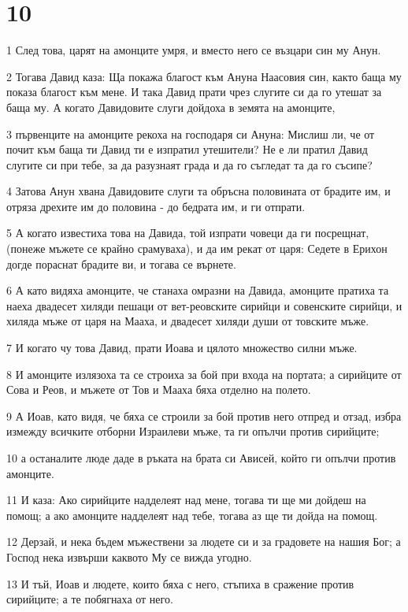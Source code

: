 \chapter{10}

\par 1 След това, царят на амонците умря, и вместо него се възцари син му Анун.
\par 2 Тогава Давид каза: Ща покажа благост към Ануна Наасовия син, както баща му показа благост към мене. И така Давид прати чрез слугите си да го утешат за баща му. А когато Давидовите слуги дойдоха в земята на амонците,
\par 3 първенците на амонците рекоха на господаря си Ануна: Мислиш ли, че от почит към баща ти Давид ти е изпратил утешители? Не е ли пратил Давид слугите си при тебе, за да разузнаят града и да го съгледат та да го съсипе?
\par 4 Затова Анун хвана Давидовите слуги та обръсна половината от брадите им, и отряза дрехите им до половина - до бедрата им, и ги отпрати.
\par 5 А когато известиха това на Давида, той изпрати човеци да ги посрещнат, (понеже мъжете се крайно срамуваха), и да им рекат от царя: Седете в Ерихон догде пораснат брадите ви, и тогава се върнете.
\par 6 А като видяха амонците, че станаха омразни на Давида, амонците пратиха та наеха двадесет хиляди пешаци от вет-реовските сирийци и совенските сирийци, и хиляда мъже от царя на Мааха, и двадесет хиляди души от товските мъже.
\par 7 И когато чу това Давид, прати Иоава и цялото множество силни мъже.
\par 8 И амонците излязоха та се строиха за бой при входа на портата; а сирийците от Сова и Реов, и мъжете от Тов и Мааха бяха отделно на полето.
\par 9 А Иоав, като видя, че бяха се строили за бой против него отпред и отзад, избра измежду всичките отборни Израилеви мъже, та ги опълчи против сирийците;
\par 10 а останалите люде даде в ръката на брата си Ависей, който ги опълчи против амонците.
\par 11 И каза: Ако сирийците надделеят над мене, тогава ти ще ми дойдеш на помощ; а ако амонците надделеят над тебе, тогава аз ще ти дойда на помощ.
\par 12 Дерзай, и нека бъдем мъжествени за людете си и за градовете на нашия Бог; а Господ нека извърши каквото Му се вижда угодно.
\par 13 И тъй, Иоав и людете, които бяха с него, стъпиха в сражение против сирийците; а те побягнаха от него.
